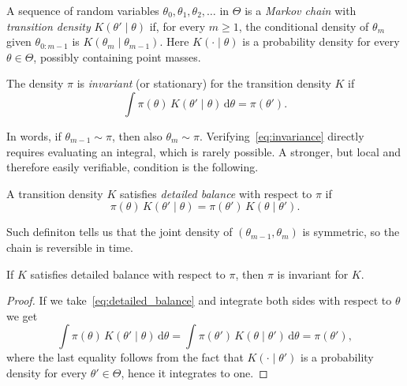 \begin{definition}
    A sequence of random variables $\theta_0,\theta_1,\theta_2,\ldots$ in $\Theta$ is a \emph{Markov chain} with \emph{transition density} $K(\theta'\mid\theta)$ if, for every $m\ge 1$, the conditional density of $\theta_m$ given $\theta_{0:m-1}$ is $K(\theta_m\mid\theta_{m-1})$. Here $K(\cdot\mid\theta)$ is a probability density for every $\theta\in\Theta$, possibly containing point masses.
\end{definition}

\begin{definition}
    The density $\pi$ is \emph{invariant} (or stationary) for the transition density $K$ if
    \begin{equation}
        \int \pi(\theta)\,K(\theta'\mid\theta)\,\mathrm{d}\theta = \pi(\theta').
        \label{eq:invariance}
    \end{equation}
\end{definition}
In words, if $\theta_{m-1}\sim\pi$, then also $\theta_m\sim\pi$. Verifying~\eqref{eq:invariance} directly requires evaluating an integral, which is rarely possible. A stronger, but local and therefore easily verifiable, condition is the following.

\begin{definition}
    A transition density $K$ satisfies \emph{detailed balance} with respect to $\pi$ if 
    \begin{equation}
        \pi(\theta)\,K(\theta'\mid\theta) = \pi(\theta')\,K(\theta\mid\theta').
        \label{eq:detailed_balance}
    \end{equation}

\end{definition}
Such definiton tells us that the joint density of $(\theta_{m-1},\theta_m)$ is symmetric, so the chain is reversible in time. 
    
\begin{proposition}
    \label{prop:detailed_balance_invariance}
    If $K$ satisfies detailed balance with respect to $\pi$, then $\pi$ is invariant for $K$.
\end{proposition}
\begin{proof}
    If we take~\eqref{eq:detailed_balance} and integrate both sides with respect to $\theta$ we get
    \begin{equation}
        \int \pi(\theta)\,K(\theta' \mid \theta)\,\mathrm{d}\theta = \int \pi(\theta')\,K(\theta \mid \theta')\,\mathrm{d}\theta = \pi(\theta'),
    \end{equation} 
    where the last equality follows from the fact that $K(\cdot\mid\theta')$ is a probability density for every $\theta'\in\Theta$, hence it integrates to one.
\end{proof}


